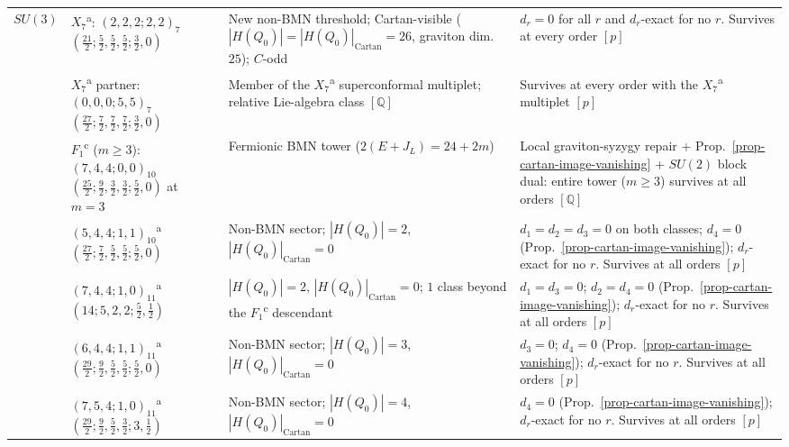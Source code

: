 \documentclass[11pt]{article}
\numberwithin{equation}{section}
\numberwithin{figure}{section}
\numberwithin{table}{section}
\newcommand{\HQ}{|H(Q_0)|}
\newcommand{\HQC}{|H(Q_0)|_{\mathrm{Cartan}}}
\begin{document}
{\begin{xltabular}{\linewidth}{|l|>{\raggedright\arraybackslash}p{3.55cm}|>{\raggedright\arraybackslash}X|>{\raggedright\arraybackslash}X|}
\hline
$SU(3)$ & $X_7$\textsuperscript{a}: $(2,2,2;2,2)_7$\newline $(\tfrac{21}2;\tfrac52,\tfrac52,\tfrac52;\tfrac32,0)$ & New non-BMN threshold; Cartan-visible ($\HQ=\HQC=26$, graviton dim.\ $25$); $C$-odd & $d_r=0$ for all $r$ and $d_r$-exact for no $r$. Survives at every order $[p]$\\
 & $X_7$\textsuperscript{a} partner: $(0,0,0;5,5)_7$\newline $(\tfrac{27}2;\tfrac72,\tfrac72,\tfrac72;\tfrac32,0)$ & Member of the $X_7$\textsuperscript{a} superconformal multiplet; relative Lie-algebra class $[\mathbb Q]$ & Survives at every order with the $X_7$\textsuperscript{a} multiplet $[p]$\\
 & $F_1$\textsuperscript{c} ($m\ge3$): $(7,4,4;0,0)_{10}$\newline $(\tfrac{25}2;\tfrac92,\tfrac32,\tfrac32;\tfrac52,0)$ at $m=3$ & Fermionic BMN tower ($2(E+J_L)=24+2m$) \cite[Section 2.2]{BraneFused} & Local graviton-syzygy repair + Prop.~\ref{prop-cartan-image-vanishing} + $SU(2)$ block dual: entire tower ($m\ge3$) survives at all orders $[\mathbb Q]$ \cite{Repo}\\
 & $(5,4,4;1,1)_{10}$\textsuperscript{a}\newline $(\tfrac{27}2;\tfrac72,\tfrac52,\tfrac52;\tfrac52,0)$ & Non-BMN sector; $\HQ=2$, $\HQC=0$ & $d_1=d_2=d_3=0$ on both classes; $d_4=0$ (Prop.~\ref{prop-cartan-image-vanishing}); $d_r$-exact for no $r$. Survives at all orders $[p]$\\
 & $(7,4,4;1,0)_{11}$\textsuperscript{a}\newline $(14;5,2,2;\tfrac52,\tfrac12)$ & $\HQ=2$, $\HQC=0$; $1$ class beyond the $F_1$\textsuperscript{c} descendant & $d_1=d_3=0$; $d_2=d_4=0$ (Prop.~\ref{prop-cartan-image-vanishing}); $d_r$-exact for no $r$. Survives at all orders $[p]$\\
 & $(6,4,4;1,1)_{11}$\textsuperscript{a}\newline $(\tfrac{29}2;\tfrac92,\tfrac52,\tfrac52;\tfrac52,0)$ & Non-BMN sector; $\HQ=3$, $\HQC=0$ & $d_3=0$; $d_4=0$ (Prop.~\ref{prop-cartan-image-vanishing}); $d_r$-exact for no $r$. Survives at all orders $[p]$\\
 & $(7,5,4;1,0)_{11}$\textsuperscript{a}\newline $(\tfrac{29}2;\tfrac92,\tfrac52,\tfrac32;3,\tfrac12)$ & Non-BMN sector; $\HQ=4$, $\HQC=0$ & $d_4=0$ (Prop.~\ref{prop-cartan-image-vanishing}); $d_r$-exact for no $r$. Survives at all orders $[p]$\\

\end{xltabular}}
\end{document}
